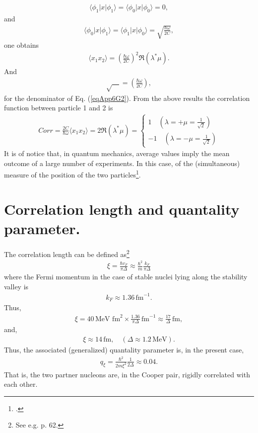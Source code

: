 \begin{subappendices}
\begin{align}\label{eqApp6G4}
\langle\phi_1|x|\phi_1\rangle=\langle\phi_0|x|\phi_0\rangle=0,
\end{align} 
and
\begin{align}\label{eqApp6G5}
\langle\phi_0|x|\phi_1\rangle=\langle\phi_1|x|\phi_0\rangle=\sqrt{\frac{\hbar\omega}{2C}},
\end{align}
one obtains
\begin{align}\label{eqApp6G6}
\langle x_1x_2\rangle=\left(\frac{\hbar\omega}{2C}\right)^2\Re(\lambda^*\mu).
\end{align} 
And 
\begin{align}\label{eqApp6G7}
\sqrt{\quad}=\left(\frac{\hbar\omega}{2C}\right),
\end{align}
for the denominator of Eq. (\ref{eqApp6G2}).
From the above results the correlation function between particle 1 and 2 is
\begin{align}\label{eqApp6G8}
Corr=\frac{2C}{\hbar\omega}\langle x_1x_2\rangle=2\Re(\lambda^*\mu)=
\left\{
\begin{array}{c}
 1\quad (\lambda=+\mu=\frac{1}{\sqrt{2}})\\ 
 -1 \quad (\lambda=-\mu=\frac{1}{\sqrt{2}})
\end{array}
\right. 
\end{align}
It is of notice that, in quantum mechanics, average values imply the mean outcome of a large number of experiments. In this case, of the (simultaneous) measure of the position of the two particles\footnote{\cite{Basdevant:05}.}.






\section{Correlation length and quantality parameter.}\label{App6H}
The correlation length can be defined as\footnote{See e.g. \cite{Annett:13} p. 62.}
\begin{align}\label{eqApp6H1}
\xi=\frac{\hbar v_F}{\pi\Delta}\approx\frac{\hbar^2}{m}\frac{k_F}{\pi\Delta}
\end{align}
where the Fermi momentum in the case of stable nuclei lying along the stability valley is
\begin{align}\label{eqApp6H2}
k_F\approx 1.36\,\text{fm}^{-1}.
\end{align}
Thus,
\begin{align}\label{eqApp6H3} 	
\xi=40\,\text{MeV fm}^2\times \frac{1.36}{\pi\Delta}\,\text{fm}^{-1}\approx \frac{17}{\Delta}\,\text{fm},
\end{align}
and,
\begin{align}\label{eqApp6H4}
\xi\approx 14\,\text{fm},\quad (\Delta\approx1.2\,\text{MeV}).
\end{align}
Thus, the associated (generalized) quantality parameter is, in the present case,
\begin{align}\label{eqApp6H8}
q_\xi=\frac{\hbar^2}{2m\xi^2}\frac{1}{2\Delta}\approx0.04.
\end{align} 
That is, the two partner nucleons are, in the Cooper pair, rigidly correlated with each other.




\end{subappendices}

